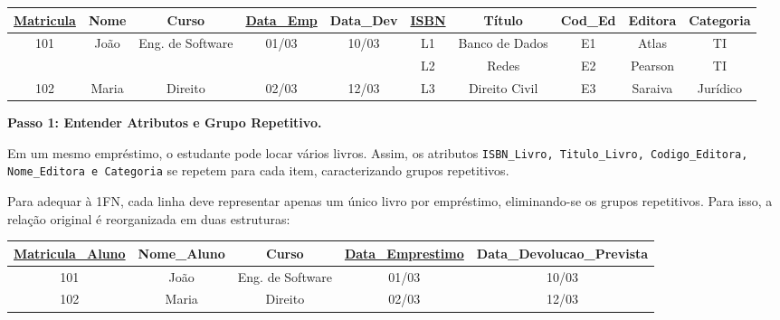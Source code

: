\vspace{0.4cm}

\centering
\renewcommand{\arraystretch}{1.2}

\begin{adjustbox}{max width=\textwidth}
\begin{tabular}{|c|c|c|c|c|c|c|c|c|c|}
\hline
\underline{Matricula} & Nome & Curso & \underline{Data\_Emp} & Data\_Dev & \underline{ISBN} & Título & Cod\_Ed & Editora & Categoria \\ \hline
101 & João & Eng. de Software & 01/03 & 10/03 & L1 & Banco de Dados & E1 & Atlas & TI \\ 
~ & ~ & ~ & ~ & ~ & L2 & Redes & E2 & Pearson & TI \\ \hline
102 & Maria & Direito & 02/03 & 12/03 & L3 & Direito Civil & E3 & Saraiva & Jurídico \\ \hline
\end{tabular}
\end{adjustbox}

\vspace{0.3cm}

\vspace{0.4cm}

\justify

\textbf{Passo 1: Entender Atributos e Grupo Repetitivo.}

Em um mesmo empréstimo, o estudante pode locar vários livros. Assim, os atributos \texttt{ISBN\_Livro, Titulo\_Livro, Codigo\_Editora, Nome\_Editora e Categoria} se repetem para cada item, caracterizando grupos repetitivos.

Para adequar à 1FN, cada linha deve representar apenas um único livro por empréstimo, eliminando-se os grupos repetitivos. Para isso, a relação original é reorganizada em duas estruturas:

\vspace{0.4cm}

\centering
\renewcommand{\arraystretch}{1.2}

\begin{adjustbox}{max width=\textwidth}
\begin{tabular}{|c|c|c|c|c|}
\hline
\textbf{\underline{Matricula\_Aluno}} & Nome\_Aluno & Curso & \textbf{\underline{Data\_Emprestimo}} & Data\_Devolucao\_Prevista \\ \hline
101 & João & Eng. de Software & 01/03 & 10/03 \\ \hline
102 & Maria & Direito & 02/03 & 12/03 \\ \hline
\end{tabular}
\end{adjustbox}

